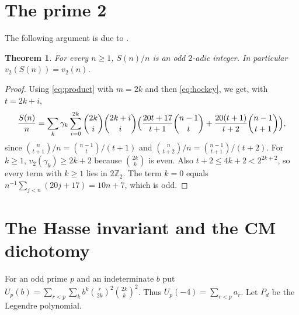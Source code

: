\documentclass[11pt]{amsart}
\newtheorem{theorem}{Theorem}[section]
\theoremstyle{definition}
\theoremstyle{remark}
\newcommand{\Z}{\mathbb{Z}}
\begin{document}
\section{The prime 2}\label{sec:two}

The following argument is due to \cite[Theorem 3.1]{K26}.

\begin{theorem}\label{thm:two}
For every $n\ge1$, $S(n)/n$ is an odd $2$-adic integer. In particular $v_2(S(n))=v_2(n)$.
\end{theorem}
\begin{proof}
Using \eqref{eq:product} with $m=2k$ and then \eqref{eq:hockey}, we get, with $t=2k+i$,
\[
\frac{S(n)}n=\sum_k\gamma_k\sum_{i=0}^{2k}\binom{2k}i\binom{2k+i}i
\Bigl(\frac{20t+17}{t+1}\binom{n-1}t+\frac{20(t+1)}{t+2}\binom{n-1}{t+1}\Bigr),
\]
since $\binom n{t+1}/n=\binom{n-1}t/(t+1)$ and $\binom n{t+2}/n=\binom{n-1}{t+1}/(t+2)$. For
$k\ge1$, $v_2(\gamma_k)\ge2k+2$ because $\binom{2k}k$ is even. Also
$t+2\le4k+2<2^{2k+2}$, so every term with $k\ge1$ lies in $2\Z_2$. The term $k=0$ equals
$n^{-1}\sum_{j<n}(20j+17)=10n+7$, which is odd.
\end{proof}

\section{The Hasse invariant and the CM dichotomy}\label{sec:CM}

For an odd prime $p$ and an indeterminate $b$ put
$U_p(b)=\sum_{r<p}\sum_kb^k\binom r{2k}^2\binom{2k}k^2$. Thus $U_p(-4)=\sum_{r<p}a_r$.
Let $P_d$ be the Legendre polynomial.
\end{document}
